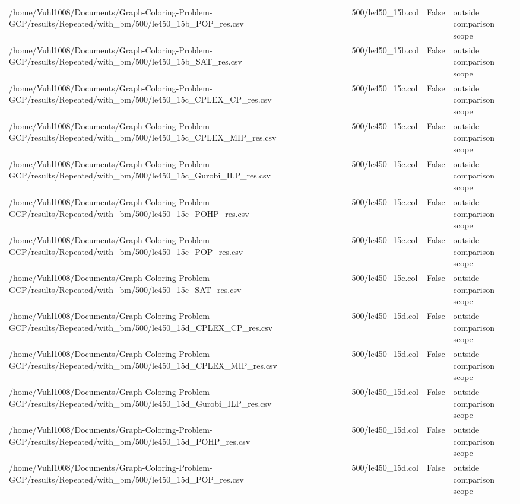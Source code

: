 \begin{table}[htbp]
\begin{tabular}{llll}
/home/Vuhl1008/Documents/Graph-Coloring-Problem-GCP/results/Repeated/with\_bm/500/le450\_15b\_POP\_res.csv & 500/le450\_15b.col & False & outside comparison scope \\
/home/Vuhl1008/Documents/Graph-Coloring-Problem-GCP/results/Repeated/with\_bm/500/le450\_15b\_SAT\_res.csv & 500/le450\_15b.col & False & outside comparison scope \\
/home/Vuhl1008/Documents/Graph-Coloring-Problem-GCP/results/Repeated/with\_bm/500/le450\_15c\_CPLEX\_CP\_res.csv & 500/le450\_15c.col & False & outside comparison scope \\
/home/Vuhl1008/Documents/Graph-Coloring-Problem-GCP/results/Repeated/with\_bm/500/le450\_15c\_CPLEX\_MIP\_res.csv & 500/le450\_15c.col & False & outside comparison scope \\
/home/Vuhl1008/Documents/Graph-Coloring-Problem-GCP/results/Repeated/with\_bm/500/le450\_15c\_Gurobi\_ILP\_res.csv & 500/le450\_15c.col & False & outside comparison scope \\
/home/Vuhl1008/Documents/Graph-Coloring-Problem-GCP/results/Repeated/with\_bm/500/le450\_15c\_POHP\_res.csv & 500/le450\_15c.col & False & outside comparison scope \\
/home/Vuhl1008/Documents/Graph-Coloring-Problem-GCP/results/Repeated/with\_bm/500/le450\_15c\_POP\_res.csv & 500/le450\_15c.col & False & outside comparison scope \\
/home/Vuhl1008/Documents/Graph-Coloring-Problem-GCP/results/Repeated/with\_bm/500/le450\_15c\_SAT\_res.csv & 500/le450\_15c.col & False & outside comparison scope \\
/home/Vuhl1008/Documents/Graph-Coloring-Problem-GCP/results/Repeated/with\_bm/500/le450\_15d\_CPLEX\_CP\_res.csv & 500/le450\_15d.col & False & outside comparison scope \\
/home/Vuhl1008/Documents/Graph-Coloring-Problem-GCP/results/Repeated/with\_bm/500/le450\_15d\_CPLEX\_MIP\_res.csv & 500/le450\_15d.col & False & outside comparison scope \\
/home/Vuhl1008/Documents/Graph-Coloring-Problem-GCP/results/Repeated/with\_bm/500/le450\_15d\_Gurobi\_ILP\_res.csv & 500/le450\_15d.col & False & outside comparison scope \\
/home/Vuhl1008/Documents/Graph-Coloring-Problem-GCP/results/Repeated/with\_bm/500/le450\_15d\_POHP\_res.csv & 500/le450\_15d.col & False & outside comparison scope \\
/home/Vuhl1008/Documents/Graph-Coloring-Problem-GCP/results/Repeated/with\_bm/500/le450\_15d\_POP\_res.csv & 500/le450\_15d.col & False & outside comparison scope \\

\end{tabular}
\end{table}
